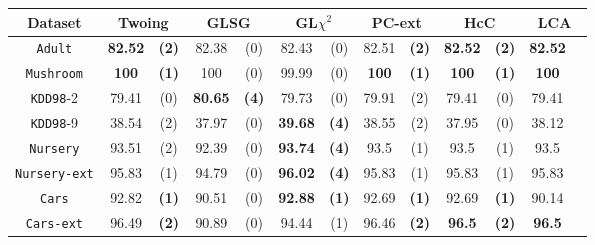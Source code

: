 \begin{table}
\small
\centering
\begin{tabular}{c|cc|cc|cc|cc|cc|cc} 
Dataset             & \multicolumn{2}{c|}{Twoing} &  \multicolumn{2}{c|}{GLSG}  & \multicolumn{2}{c|}{GL$\chi^2$} & \multicolumn{2}{c|}{PC-ext}& \multicolumn{2}{c|}{HcC}& \multicolumn{2}{c}{LCA}\\
\hline
{\tt Adult}         &  {\bf 82.52} & {\bf (2)}    &  82.38       & (0)          &  82.43       & (0)              & 82.51      & {\bf (2)}    & {\bf 82.52}& {\bf (2)}  & {\bf 82.52}&            \\
{\tt Mushroom}      &  {\bf 100}   & {\bf (1)}    &  100         & (0)          &  99.99       & (0)              & {\bf 100 } & {\bf (1)}    & {\bf 100}  & {\bf (1)}  & {\bf 100}  &            \\
{\tt KDD98}-2       &  79.41       & (0)          &  {\bf 80.65} & {\bf (4)}    &  79.73       & (0)              & 79.91      & (2)          & 79.41      & (0)        & 79.41      &            \\
{\tt KDD98}-9       &  38.54       & (2)          &  37.97       & (0)          &  {\bf 39.68} & {\bf (4)}        & 38.55      & (2)          & 37.95      & (0)        & 38.12      &            \\
{\tt Nursery}       &  93.51       & (2)          &  92.39       & (0)          &  {\bf 93.74} & {\bf (4)}        & 93.5       & (1)          & 93.5       & (1)        & 93.5       &            \\
{\tt Nursery-ext}   &  95.83       & (1)          &  94.79       & (0)          &  {\bf 96.02} & {\bf (4)}        & 95.83      & (1)          & 95.83      & (1)        & 95.83      &            \\
{\tt Cars}          &  92.82       & {\bf (1)}    &  90.51       & (0)          &  {\bf 92.88} & {\bf (1)}        & 92.69      & {\bf (1)}    & 92.69      & {\bf (1)}  & 90.14      &            \\
{\tt Cars-ext}      &  96.49       & {\bf (2)}    &  90.89       & (0)          &  94.44       & (1)              & 96.46      & {\bf (2)}    & {\bf 96.5} & {\bf (2)}  & {\bf 96.5} &            \\

\end{tabular}
\end{table}
